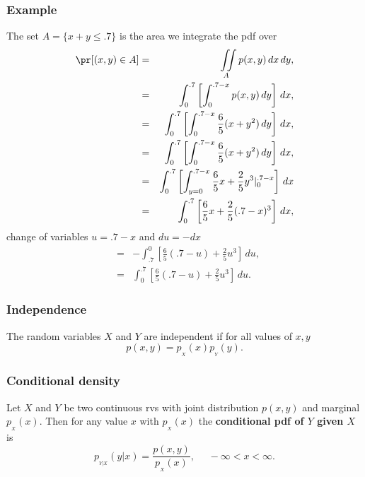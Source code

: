 \begin{frame}[fragile]\frametitle{Example}

{\tiny
The set $A = \{x+y \leq .7\}$ is the area we integrate the pdf
over
\begin{eqnarray*}
\pr[(x,y) \in A] &= & \iint \limits_A p(x,y) \, dx \, dy,  \\
 &= & \int_0^{.7} \left[ \int_{0}^{.7-x}  p(x,y) \, dy
\right] \, dx, \\ 
  &= & \int_0^{.7} \left[ \int_{0}^{.7-x}   \frac{6}{5}(x+y^2)\, dy
  \right] \, dx, \\ 
  &= & \int_0^{.7} \left[ \int_{0}^{.7-x}   \frac{6}{5}(x+y^2)\, dy
  \right] \, dx, \\ 
  &= & \int_0^{.7} \left[ \int_{y=0}^{.7-x} \frac{6}{5}x +\frac{2}{5}
    y^3 |_{0}^{.7-x} \right]\, dx \\ 
  &= & \int_0^{.7} \left[  \frac{6}{5}x +\frac{2}{5}
    (.7-x)^3 \right]\, dx,
\end{eqnarray*}
change of variables $u=.7-x$ and $du = -dx$
\begin{eqnarray*}
  &= & -\int_{.7}^{0} \left[  \frac{6}{5}(.7-u) +\frac{2}{5}
    u^3 \right]\, du,\\ 
  &= & \int_{0}^{.7} \left[  \frac{6}{5}(.7-u) +\frac{2}{5}
    u^3 \right]\, du.
\end{eqnarray*}


}

\end{frame}


\begin{frame}[fragile]\frametitle{Independence}


\begin{defn}
The random variables $X$ and $Y$ are independent if
for all values of $x,y$
$$p(x,y) = p_{_X}(x)p_{_Y}(y).$$
\end{defn}

\end{frame}


\begin{frame}[fragile]\frametitle{Conditional density}


\begin{defn}
Let $X$ and $Y$ be two continuous rvs with joint distribution
$p(x,y)$ and marginal $p_{_X}(x)$. Then for any value $x$
with $p_{_X}(x)$ the {\bf conditional pdf of $Y$ given $X$}
is
$$p_{_{Y|X}}(y|x) = \frac{p(x,y)}{p_{_X}(x)}, \, \, \, \, \, \, \, \,
-\infty <  x < \infty.$$
\end{defn}

\end{frame}


